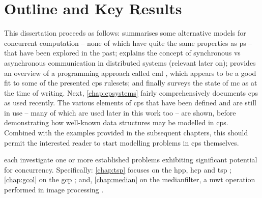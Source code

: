 
\section{Outline and Key Results}

This dissertation proceeds as follows:  summarises some alternative models for concurrent computation -- none of which have quite the same properties as \gls{ps} -- that have been explored in the past;  explains the concept of synchronous vs asynchronous communication in distributed systems (relevant later on);  provides an overview of a programming approach called \gls{cml} \cite{Reppy2007,Reppy1991}, which appears to be a good fit to some of the presented \gls{cps} \glspl{ruleset}; and finally surveys the state of \gls{mc} as at the time of writing.  Next, \cref{chap:cpsystems} fairly comprehensively documents \gls{cps} as used recently.  The various elements of \gls{cps} that have been defined and are still in use -- many of which are used later in this work too -- are shown, before demonstrating how well-known data structures may be modelled in \gls{cps}.  Combined with the examples provided in the subsequent chapters, this should permit the interested reader to start modelling problems in \gls{cps} themselves.

 each investigate one or more established problems exhibiting significant potential for concurrency.  Specifically: \cref{chap:tsp} focuses on the \gls{hpp}, \gls{hcp} and \gls{tsp} \cite{Applegate2006,Cook2012}; \cref{chap:gcol} on the \gls{gcp} \cite{Lewis2016}; and, \cref{chap:median} on the \gls{medianfilter}, a \gls{mwt} operation performed in image processing \cite{Fisher2016,Gimelfarb2018}.

